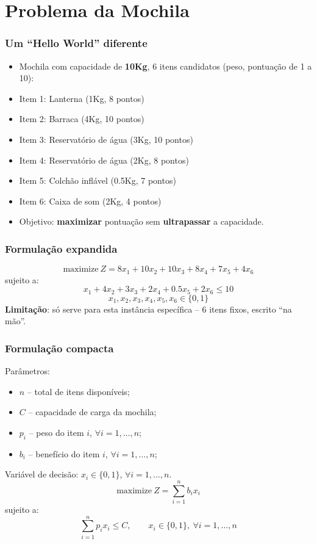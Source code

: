 \documentclass[fleqn]{beamer}
\begin{document}
\section{Problema da Mochila}

\begin{frame}
	\frametitle{Um ``Hello World'' diferente}
	\begin{itemize}
		\item Mochila com capacidade de \textbf{10Kg}, 6 itens candidatos
			(peso, pontuação de 1 a 10):
		\item Item 1: Lanterna (1Kg, 8 pontos)
		\item Item 2: Barraca (4Kg, 10 pontos)
		\item Item 3: Reservatório de água (3Kg, 10 pontos)
		\item Item 4: Reservatório de água (2Kg, 8 pontos)
		\item Item 5: Colchão inflável (0.5Kg, 7 pontos)
		\item Item 6: Caixa de som (2Kg, 4 pontos)
		\item Objetivo: \textbf{maximizar} pontuação sem
			\textbf{ultrapassar} a capacidade.
	\end{itemize}
\end{frame}

\begin{frame}
	\frametitle{Formulação expandida}
	$$
		\text{maximize}~Z = 8x_1 + 10x_2 + 10x_3 + 8x_4 + 7x_5 + 4x_6
	$$
	sujeito a:
	$$
		x_1 + 4x_2 + 3x_3 + 2x_4 + 0.5x_5 + 2x_6 \leq 10
	$$
	$$
		x_1, x_2, x_3, x_4, x_5, x_6 \in \{0,1\}
	$$
	\vspace{0.3cm}
	\textbf{Limitação}: só serve para esta instância específica -- 6
	itens fixos, escrito ``na mão''.
\end{frame}

\begin{frame}
	\frametitle{Formulação compacta}
	Parâmetros:
	\begin{itemize}
		\item $n$ -- total de itens disponíveis;
		\item $C$ -- capacidade de carga da mochila;
		\item $p_i$ -- peso do item $i$, $\forall i = 1,\dots,n$;
		\item $b_i$ -- benefício do item $i$, $\forall i = 1,\dots,n$;
	\end{itemize}
	Variável de decisão: $x_i \in \{0,1\}$, $\forall i = 1,\dots,n$.
	$$
		\text{maximize}~Z = \sum_{i=1}^{n} b_i x_i
	$$
	sujeito a:
	$$
		\sum_{i=1}^{n} p_i x_i \leq C, \qquad x_i \in \{0,1\},~\forall i=1,\dots,n
	$$
\end{frame}
\end{document}
